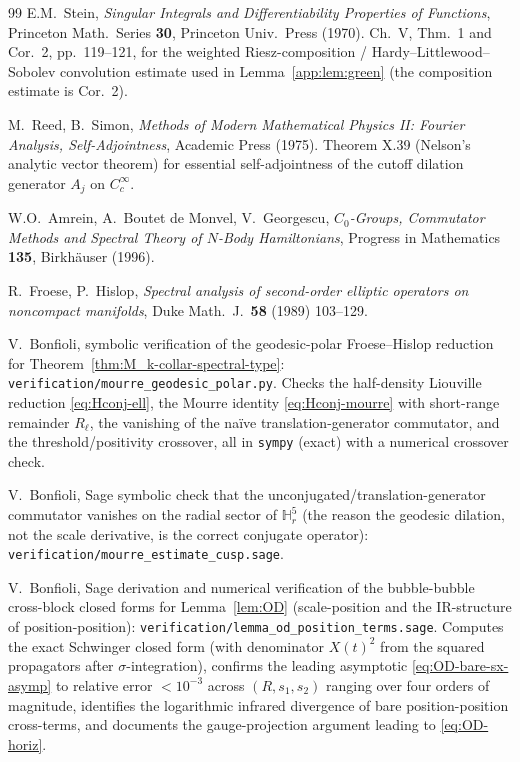 \documentclass[11pt,letterpaper]{article}
\theoremstyle{definition}
\newcommand{\bbH}{\mathbb{H}}
\begin{document}
\begin{thebibliography}{99}
 E.M.\ Stein, \emph{Singular Integrals and Differentiability Properties of Functions}, Princeton Math.\ Series \textbf{30}, Princeton Univ.\ Press (1970). Ch.\ V, Thm.\ 1 and Cor.\ 2, pp.\ 119--121, for the weighted Riesz-composition / Hardy--Littlewood--Sobolev convolution estimate used in Lemma~\ref{app:lem:green} (the composition estimate is Cor.\ 2).

 M.\ Reed, B.\ Simon, \emph{Methods of Modern Mathematical Physics II: Fourier Analysis, Self-Adjointness}, Academic Press (1975). Theorem X.39 (Nelson's analytic vector theorem) for essential self-adjointness of the cutoff dilation generator $A_j$ on $C_c^\infty$.

 W.O.\ Amrein, A.\ Boutet de Monvel, V.\ Georgescu, \emph{$C_0$-Groups, Commutator Methods and Spectral Theory of $N$-Body Hamiltonians}, Progress in Mathematics \textbf{135}, Birkh\"auser (1996).

 R.\ Froese, P.\ Hislop, \emph{Spectral analysis of second-order elliptic operators on noncompact manifolds}, Duke Math.\ J.\ \textbf{58} (1989) 103--129.

 V.\ Bonfioli, symbolic verification of the geodesic-polar Froese--Hislop reduction for Theorem~\ref{thm:M_k-collar-spectral-type}: \texttt{verification/mourre\_geodesic\_polar.py}. Checks the half-density Liouville reduction \eqref{eq:Hconj-ell}, the Mourre identity \eqref{eq:Hconj-mourre} with short-range remainder $R_\ell$, the vanishing of the na\"ive translation-generator commutator, and the threshold/positivity crossover, all in \texttt{sympy} (exact) with a numerical crossover check.

 V.\ Bonfioli, Sage symbolic check that the unconjugated/translation-generator commutator vanishes on the radial sector of $\bbH^5_r$ (the reason the geodesic dilation, not the scale derivative, is the correct conjugate operator): \texttt{verification/mourre\_estimate\_cusp.sage}.

 V.\ Bonfioli, Sage derivation and numerical verification of the bubble-bubble cross-block closed forms for Lemma~\ref{lem:OD} (scale-position and the IR-structure of position-position): \texttt{verification/lemma\_od\_position\_terms.sage}. Computes the exact Schwinger closed form (with denominator $X(t)^2$ from the squared propagators after $\sigma$-integration), confirms the leading asymptotic \eqref{eq:OD-bare-sx-asymp} to relative error $<10^{-3}$ across $(R, s_1, s_2)$ ranging over four orders of magnitude, identifies the logarithmic infrared divergence of bare position-position cross-terms, and documents the gauge-projection argument leading to \eqref{eq:OD-horiz}.

\end{thebibliography}
\end{document}
